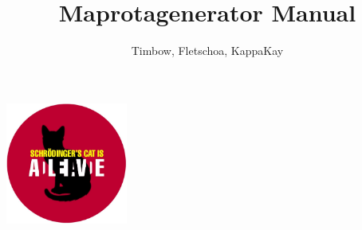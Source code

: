 \documentclass[a4paper, 11pt]{article}
\title{Maprotagenerator Manual}
\author{Timbow, Fletschoa, KappaKay}
\date{}
\begin{document}
\maketitle
\begin{center}
    \includegraphics[width=0.3\textwidth]{SK.jpg}
\end{center}
\tableofcontents

\newpage






    
\end{document}
